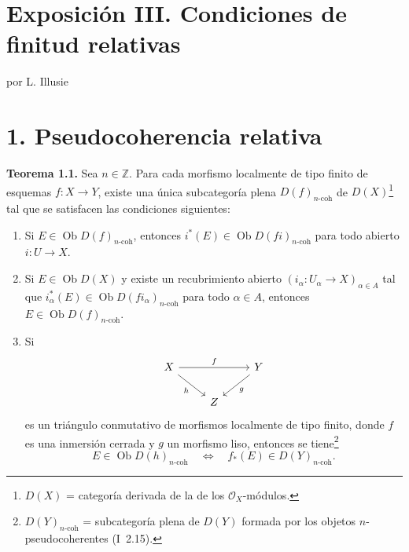 \providecommand{\sisi}[2]{#2}

\providecommand{\Ob}{\operatorname{Ob}}
\providecommand{\qcoh}{\mathrm{qcoh}}
\providecommand{\coh}{\mathrm{coh}}
\providecommand{\torf}{\mathrm{torf}}
\providecommand{\toramp}{\operatorname{tor.amp}}
\providecommand{\amp}{\operatorname{amp}}
\providecommand{\Id}{\operatorname{Id}}
\providecommand{\pr}{\operatorname{pr}}
\providecommand{\coker}{\operatorname{coker}}
\providecommand{\im}{\operatorname{Im}}
\providecommand{\Spec}{\operatorname{Spec}}

\section*{Exposición III. Condiciones de finitud relativas}
\begin{center}
por L. Illusie
\end{center}

\section*{1. Pseudocoherencia relativa}

\textbf{Teorema 1.1.} Sea \(n\in\mathbb Z\). Para cada morfismo localmente de tipo finito de esquemas \(f:X\longrightarrow Y\), existe una única subcategoría plena \(D(f)_{n\text{-}\coh}\) de \(D(X)\)\footnote{\(D(X)\) = categoría derivada de la de los \(\mathcal O_X\)-módulos.} tal que se satisfacen las condiciones siguientes:
\begin{enumerate}[label=(\roman*)]
\item Si \(E\in\Ob D(f)_{n\text{-}\coh}\), entonces \(i^*(E)\in\Ob D(fi)_{n\text{-}\coh}\) para todo abierto \(i:U\to X\).

\item Si \(E\in\Ob D(X)\) y existe un recubrimiento abierto \((i_\alpha:U_\alpha\to X)_{\alpha\in A}\) tal que \(i_\alpha^*(E)\in\Ob D(fi_\alpha)_{n\text{-}\coh}\) para todo \(\alpha\in A\), entonces \(E\in\Ob D(f)_{n\text{-}\coh}\).

\item Si
\[
\begin{tikzcd}
X \arrow[rr,"f"] \arrow[dr,"h"'] & & Y \arrow[dl,"g"]\\
& Z &
\end{tikzcd}
\]
es un triángulo conmutativo de morfismos localmente de tipo finito, donde \(f\) es una inmersión cerrada y \(g\) un morfismo liso, entonces se tiene\footnote{\(D(Y)_{n\text{-}\coh}\) = subcategoría plena de \(D(Y)\) formada por los objetos \(n\)-pseudocoherentes (I~2.15).}
\[
 E\in\Ob D(h)_{n\text{-}\coh}
 \quad\Longleftrightarrow\quad
 f_*(E)\in D(Y)_{n\text{-}\coh}.
\]
\end{enumerate}

